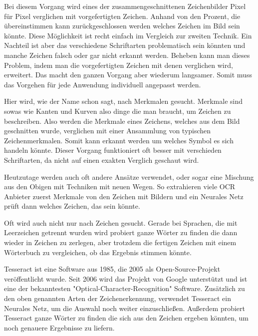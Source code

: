 Bei diesem Vorgang wird eines der zusammengeschnittenen Zeichenbilder Pixel für Pixel verglichen mit vorgefertigten Zeichen. Anhand von den Prozent, die übereinstimmen kann zurückgeschlossen werden welches Zeichen im Bild sein könnte. Diese Möglichkeit ist recht einfach im Vergleich zur zweiten Technik. Ein Nachteil ist aber das verschiedene Schriftarten problematisch sein könnten und manche Zeichen falsch oder gar nicht erkannt werden. Beheben kann man dieses Problem, indem man die vorgefertigten Zeichen mit denen verglichen wird, erweitert. Das macht den ganzen Vorgang aber wiederum langsamer. Somit muss das Vorgehen für jede Anwendung individuell angepasst werden.


Hier wird, wie der Name schon sagt, nach Merkmalen gesucht. Merkmale sind sowas wie Kanten und Kurven also dinge die man braucht, um Zeichen zu beschreiben. Also werden die Merkmale eines Zeichens, welches aus dem Bild geschnitten wurde, verglichen mit einer Ansammlung von typischen Zeichenmerkmalen. Somit kann erkannt werden um welches Symbol es sich handeln könnte. Dieser Vorgang funktioniert oft besser mit verschieden Schriftarten, da nicht auf einen exakten Verglich geschaut wird.

Heutzutage werden auch oft andere Ansätze verwendet, oder sogar eine Mischung aus den Obigen mit Techniken mit neuen Wegen. So extrahieren viele OCR Anbieter zuerst Merkmale von den Zeichen mit Bildern und ein Neurales Netz prüft dann welches Zeichen, das sein könnte.

Oft wird auch nicht nur nach Zeichen gesucht. Gerade bei Sprachen, die mit Leerzeichen getrennt wurden wird probiert ganze Wörter zu finden die dann wieder in Zeichen zu zerlegen, aber trotzdem die fertigen Zeichen mit einem Wörterbuch zu vergleichen, ob das Ergebnis stimmen könnte.


Tesseract ist eine Software aus 1985, die 2005 als Open-Source-Projekt veröffentlicht wurde. Seit 2006 wird das Projekt von Google unterstützt und ist eine der bekanntesten "Optical-Character-Recognition" Software. Zusätzlich zu den oben genannten Arten der Zeichenerkennung, verwendet Tesseract ein Neurales Netz, um die Auswahl noch weiter einzuschließen. Außerdem probiert Tesseract ganze Wörter zu finden die sich aus den Zeichen ergeben könnten, um noch genauere Ergebnisse zu liefern.\cite{OCRIntro}


